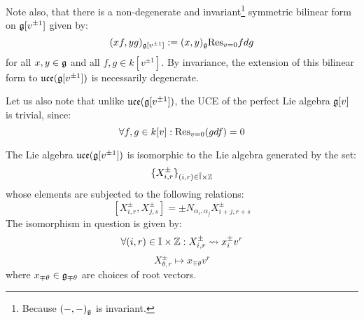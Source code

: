 \begin{example}
            Note also, that there is a non-degenerate and invariant\footnote{Because $(-, -)_{\mathfrak{g}}$ is invariant.} symmetric bilinear form on $\mathfrak{g}[v^{\pm 1}]$ given by:
                $$(xf, yg)_{\mathfrak{g}[v^{\pm 1}]} := (x, y)_{\mathfrak{g}} \mathrm{Res}_{v = 0} f dg$$
            for all $x, y \in \mathfrak{g}$ and all $f, g \in k[v^{\pm 1}]$. By invariance, the extension of this bilinear form to $\mathfrak{uce}(\mathfrak{g}[v^{\pm 1}])$ is necessarily degenerate.

            Let us also note that unlike $\mathfrak{uce}(\mathfrak{g}[v^{\pm 1}])$, the UCE of the perfect Lie algebra $\mathfrak{g}[v]$ is trivial, since:
                $$\forall f, g \in k[v]: \mathrm{Res}_{v = 0}(g df) = 0$$
        \end{example}

        \begin{lemma} \label{lemma: root_grading_for_affine_lie_algebras}
            The Lie algebra $\mathfrak{uce}(\mathfrak{g}[v^{\pm 1}])$ is isomorphic to the Lie algebra generated by the set:
                $$\{ X_{i, r}^{\pm} \}_{(i, r) \in \hat{\simpleroots} \x \Z}$$
            whose elements are subjected to the following relations:
                $$[X_{i, r}^{\pm}, X_{j, s}^{\pm}] = \pm N_{\alpha_i, \alpha_j} X_{i + j, r + s}^{\pm}$$
            The isomorphism in question is given by:
                $$\forall (i, r) \in \simpleroots \x \Z: X_{i, r}^{\pm} \mapsto x_i^{\pm} v^r$$
                $$X_{\theta, r}^{\pm} \mapsto x_{\mp \theta} v^r$$
            where $x_{\mp \theta} \in \mathfrak{g}_{\mp \theta}$ are choices of root vectors.
        \end{lemma}

